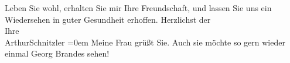 \begin{ledgroupsized}[t]{13cm}
           \pstart
           Leben Sie wohl, erhalten Sie mir Ihre Freundschaft, und lassen Sie uns ein
                    Wiedersehen in guter Gesundheit erhoffen.\pend
           \pstart
           Herzlichst der{\\[\baselineskip]}Ihre{\\[\baselineskip]}\spacefill\mbox{ArthurSchnitzler}\pend
           \leftskip=0em{}\pstart
           \noindent{}Meine Frau grüßt Sie.
                        Auch sie möchte so gern wieder einmal Georg Brandes sehen!\pend
           \endnumbering{}\end{ledgroupsized}  \newcommand{\dateiname}{L02035}\newcommand{\titel}{Arthur Schnitzler an Georg Brandes, 12. 10. 1911}\newcommand{\editorInnen}{Martin Anton Müller und Gerd-Hermann Susen}
      